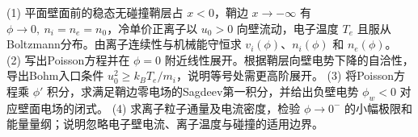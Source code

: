 (1) 平面壁面前的稳态无碰撞鞘层占 \(x<0\)，鞘边 \(x\to-\infty\) 有 \(\phi\to0,\ n_i=n_e=n_0\)，冷单价正离子以 \(u_0>0\) 向壁流动，电子温度 \(T_e\) 且服从Boltzmann分布。由离子连续性与机械能守恒求 \(v_i(\phi)\)、\(n_i(\phi)\) 和 \(n_e(\phi)\)。
(2) 写出Poisson方程并在 \(\phi=0\) 附近线性展开。根据鞘层向壁电势下降的自洽性，导出Bohm入口条件 \(u_0^2\ge k_BT_e/m_i\)，说明等号处需更高阶展开。
(3) 将Poisson方程乘 \(\phi'\) 积分，求满足鞘边零电场的Sagdeev第一积分，并给出负壁电势 \(\phi_w<0\) 对应壁面电场的闭式。
(4) 求离子粒子通量及电流密度，检验 \(\phi\to0^-\) 的小幅极限和能量量纲；说明忽略电子壁电流、离子温度与碰撞的适用边界。
